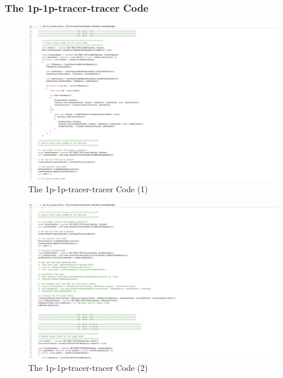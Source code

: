 
\subsubsection*{The 1p-1p-tracer-tracer Code}
\begin{figure}[h]
\centering
\includegraphics[width=350mm]{1p_1p_tracer_tracer_1}
\caption{\footnotesize The 1p-1p-tracer-tracer Code (1)}
\label{fig:1p-1p-tracer-tracer-1}
\end{figure}
\begin{figure}[h]
\centering
\includegraphics[width=350mm]{1p_1p_tracer_tracer_2}
\caption{\footnotesize The 1p-1p-tracer-tracer Code (2)}
\label{fig:1p-1p-tracer-tracer-2}
\end{figure}

